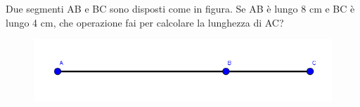 \item Due segmenti AB e BC sono disposti come in figura. Se AB è lungo 8 cm e BC è lungo 4 cm, che operazione fai per calcolare la lunghezza di AC?
\begin{figure}[h]
\centering
\includegraphics[width=13cm]{figure/somma_diff_segmenti.PNG}
\end{figure}
